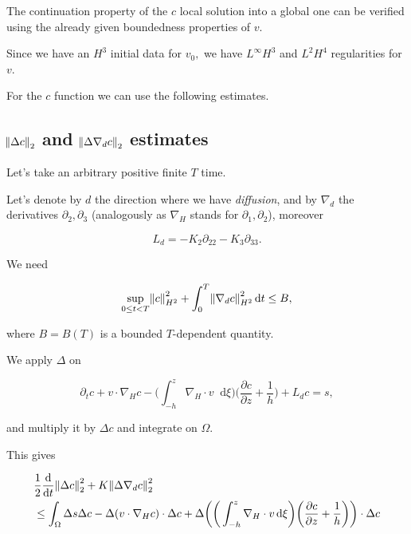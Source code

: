 \documentclass[11pt]{article}
\newcommand*\diff{\mathop{}\!\mathrm{d}}
\begin{document}
The continuation property of the $c$ local solution into a global one can be verified using the already given boundedness properties of $v.$

Since we have an $H^3$ initial data for $v_0,$ we have $L^\infty H^3$ and $L^2 H^4$ regularities for $v.$

For the $c$ function we can use the following estimates.

\subsection{$\norm{\Delta c}_2$ and $\norm{\Delta \nabla_d c}_2$ estimates}

Let's take an arbitrary positive finite $T$ time.

Let's denote by $d$ the direction where we have \textit{diffusion}, and by $\nabla_d$ the derivatives $\partial_2, \partial_3$ (analogously as $\nabla_H$ stands for $\partial_1, \partial_2$), moreover

$$ L_d = - K_2 \partial_{22} - K_3 \partial_{33}.$$

We need

$$ \sup_{0 \leq t < T} \norm{c}_{H^2}^2 + \int_0^T \norm{\nabla_d c}_{H^2}^2 \diff t \leq B,$$

where $B=B(T)$ is a bounded $T$-dependent quantity.

We apply $\Delta$ on

\begin{equation}   
    \partial_t c + v \cdot \nabla_H c - \bigg ( \int_{-h}^z \nabla_H \cdot v \diff \xi \bigg) \bigg ( \frac{\partial c}{\partial z} + \frac{1}{h}\bigg) + L_d c = s,
\end{equation}

and multiply it by $\Delta c$ and integrate on $\Omega.$

This gives

\begin{equation} \label{firstformboundc}
  \begin{split}
    & \frac{1}{2} \frac{\diff}{\diff t} \norm{\Delta c}_2^2 + K \norm{\Delta \nabla_d c}_2^2 \\
    & \leq \int_\Omega \Delta s \Delta c - \Delta ( v \cdot \nabla_H c) \cdot \Delta c + \Delta \bigg ( \bigg ( \int_{-h}^z \nabla_H \cdot v \diff \xi \bigg) \bigg ( \frac{\partial c}{\partial z} + \frac{1}{h}\bigg) \bigg ) \cdot \Delta c
  \end{split}
\end{equation}
\end{document}
